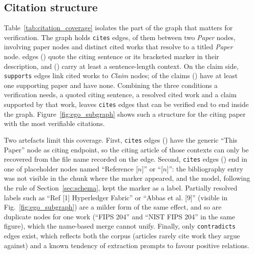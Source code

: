 \documentclass[lettersize,journal]{IEEEtran}
\begin{document}


\subsection{Citation structure}
\label{sec:citation_structure}

Table~\ref{tab:citation_coverage} isolates the part of the graph that matters for verification. The graph holds \nCites{} \texttt{cites} edges, \nCitesPaperPaper{} of them between two \emph{Paper} nodes, involving \nPapersInCites{} paper nodes and \nCitedResolved{} distinct cited works that resolve to a titled \emph{Paper} node. \nCitesSentenceStrict{} edges (\pctCitesSentenceStrict) quote the citing sentence or its bracketed marker in their description, and \nCitesSentence{} (\pctCitesSentence) carry at least a sentence-length context. On the claim side, \nSupports{} \texttt{supports} edges link \nCitedAndSupporting{} cited works to \emph{Claim} nodes; \nClaimsSupported{} of the \nClaims{} claims (\pctClaimsSupported) have at least one supporting paper and \nClaimsUnsupported{} have none. Combining the three conditions a verification needs, a quoted citing sentence, a resolved cited work and a claim supported by that work, leaves \nVerifiableEdges{} \texttt{cites} edges that can be verified end to end inside the graph. Figure~\ref{fig:ego_subgraph} shows such a structure for the citing paper with the most verifiable citations.

Two artefacts limit this coverage. First, \nCitesHub{} \texttt{cites} edges (\pctCitesHub) have the generic ``This Paper'' node as citing endpoint, so the citing article of those contexts can only be recovered from the file name recorded on the edge. Second, \nCitesPlaceholder{} \texttt{cites} edges (\pctCitesPlaceholder) end in one of \nPlaceholderNodes{} placeholder nodes named ``Reference [$n$]'' or ``[$n$]'': the bibliography entry was not visible in the chunk where the marker appeared, and the model, following the rule of Section~\ref{sec:schema}, kept the marker as a label. Partially resolved labels such as ``Ref [1] Hyperledger Fabric'' or ``Abbas et al. [9]'' (visible in Fig.~\ref{fig:ego_subgraph}) are a milder form of the same effect, and so are duplicate nodes for one work (``FIPS 204'' and ``NIST FIPS 204'' in the same figure), which the name-based merge cannot unify. Finally, only \nContradicts{} \texttt{contradicts} edges exist, which reflects both the corpus (articles rarely cite work they argue against) and a known tendency of extraction prompts to favour positive relations.
\end{document}
